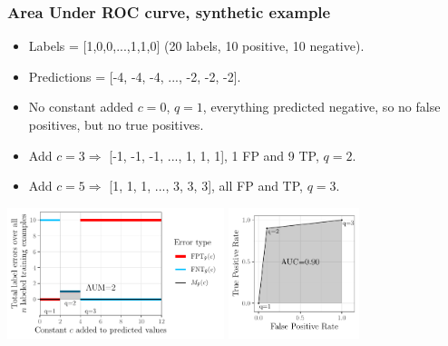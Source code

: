 \documentclass{beamer}
\begin{document}
\begin{frame}
  \frametitle{Area Under ROC curve, synthetic example}

\begin{itemize}
  \item Labels = [1,0,0,...,1,1,0] (20 labels, 10 positive, 10 negative).
  \item Predictions = [-4, -4, -4, ..., -2, -2, -2].
  \item No constant added $c=0$, $q=1$, everything predicted negative,
    so no false positives, but no true positives.
\item Add $c=3 \Rightarrow$ [-1, -1, -1, ..., 1, 1, 1], 1 FP and
  9 TP, $q=2$.
\item  Add $c=5 \Rightarrow$ [1, 1, 1, ..., 3, 3, 3], all FP and TP, $q=3$.
  \end{itemize}

  \includegraphics[height=1.5in]{figure-more-than-one-less-aum-nomath}
  \includegraphics[height=1.5in]{figure-more-than-one-less-auc}

\end{frame}
\end{document}
